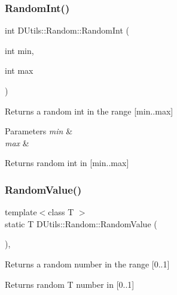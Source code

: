 \subsubsection{\texorpdfstring{Random\+Int()}{RandomInt()}}
{\footnotesize\ttfamily int D\+Utils\+::\+Random\+::\+Random\+Int (\begin{DoxyParamCaption}\item[{int}]{min,  }\item[{int}]{max }\end{DoxyParamCaption})\hspace{0.3cm}{\ttfamily [static]}}

Returns a random int in the range \mbox{[}min..max\mbox{]} 
\begin{DoxyParams}{Parameters}
{\em min} & \\
\hline
{\em max} & \\
\hline
\end{DoxyParams}
\begin{DoxyReturn}{Returns}
random int in \mbox{[}min..max\mbox{]} 
\end{DoxyReturn}
\mbox{\label{class_d_utils_1_1_random_ac5d2e4d977afdec30071c531a7a96d88}} 
\subsubsection{\texorpdfstring{Random\+Value()}{RandomValue()}\hspace{0.1cm}{\footnotesize\ttfamily [1/2]}}
{\footnotesize\ttfamily template$<$class T $>$ \\
static T D\+Utils\+::\+Random\+::\+Random\+Value (\begin{DoxyParamCaption}{ }\end{DoxyParamCaption})\hspace{0.3cm}{\ttfamily [inline]}, {\ttfamily [static]}}

Returns a random number in the range \mbox{[}0..1\mbox{]} \begin{DoxyReturn}{Returns}
random T number in \mbox{[}0..1\mbox{]} 
\end{DoxyReturn}
\mbox{\label{class_d_utils_1_1_random_a13760f5d6d4b866fbcc350dbb0d39d02}} 
